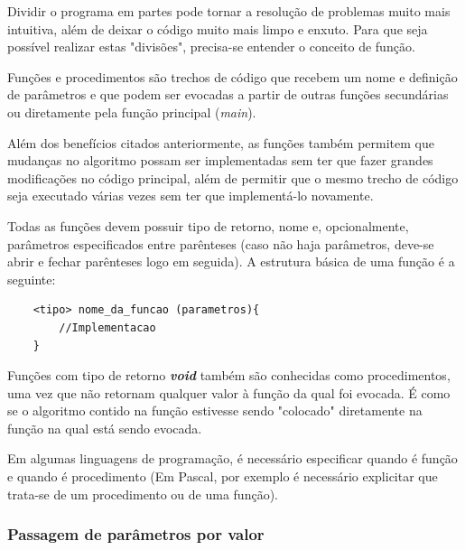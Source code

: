 \documentclass[12pt]{article}
\newcommand\tab[1][1cm]{\hspace*{#1}}
\begin{document}
\par\tab Dividir o programa em partes pode tornar a resolução de problemas muito mais intuitiva, além de deixar o código muito mais limpo e enxuto. Para que seja possível realizar estas "divisões", precisa-se entender o conceito de função.

\par\tab Funções e procedimentos são trechos de código que recebem um nome e definição de parâmetros e que podem ser evocadas a partir de outras funções secundárias ou diretamente pela função principal (\textit{main}).

\par\tab Além dos benefícios citados anteriormente, as funções também permitem que mudanças no algoritmo possam ser implementadas sem ter que fazer grandes modificações no código principal, além de permitir que o mesmo trecho de código seja executado várias vezes sem ter que implementá-lo novamente\cite{site:funcoes}.

\par\tab Todas as funções devem possuir tipo de retorno, nome e, opcionalmente, parâmetros especificados entre parênteses (caso não haja parâmetros, deve-se abrir e fechar parênteses logo em seguida). A estrutura básica de uma função é a seguinte:

\hspace{0.25cm}
\begin{lstlisting}
    <tipo> nome_da_funcao (parametros){
        //Implementacao
    }
\end{lstlisting}

\hspace{0.25cm}
\begin{tcolorbox}[colback=green!5!white,colframe=green!75!black,title=Curiosidade]
  \par\tab Funções com tipo de retorno \textit{\textbf{void}} também são conhecidas como procedimentos, uma vez que não retornam qualquer valor à função da qual foi evocada. É como se o algoritmo contido na função estivesse sendo "colocado" diretamente na função na qual está sendo evocada.
  \par\tab Em algumas linguagens de programação, é necessário especificar quando é função e quando é procedimento (Em Pascal, por exemplo é necessário explicitar que trata-se de um procedimento ou de uma função).
\end{tcolorbox}

\subsubsection{Passagem de parâmetros por valor}
\end{document}
